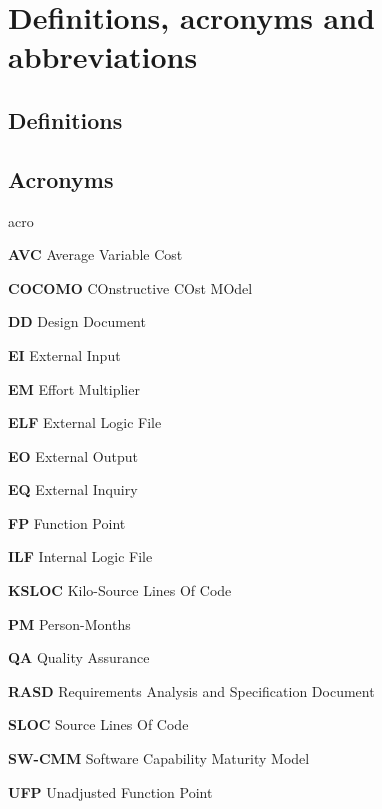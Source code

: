 \section{Definitions, acronyms and abbreviations}

\subsection{Definitions}

\subsection{Acronyms}
	\begin{labeling}{acro}
		\item[\textbf{AVC}] Average Variable Cost
		\item[\textbf{COCOMO}] COnstructive COst MOdel
		\item[\textbf{DD}] Design Document
		\item[\textbf{EI}] External Input
		\item[\textbf{EM}] Effort Multiplier
		\item[\textbf{ELF}] External Logic File
		\item[\textbf{EO}] External Output
		\item[\textbf{EQ}] External Inquiry
		\item[\textbf{FP}] Function Point
		\item[\textbf{ILF}] Internal Logic File
		\item[\textbf{KSLOC}] Kilo-Source Lines Of Code
		\item[\textbf{PM}] Person-Months
		\item[\textbf{QA}] Quality Assurance
		\item[\textbf{RASD}] Requirements Analysis and Specification Document
		\item[\textbf{SLOC}] Source Lines Of Code
		\item[\textbf{SW-CMM}] Software Capability Maturity Model
		\item[\textbf{UFP}] Unadjusted Function Point
	\end{labeling}

